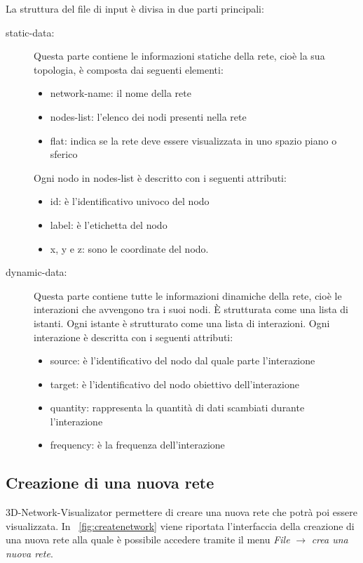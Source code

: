 \documentclass[a4paper,12pt]{article}
\begin{document}
La struttura del file di input \`e divisa in due parti principali:
\begin{description}
 \item[static-data:] Questa parte contiene le informazioni statiche della rete, cio\`e la sua topologia, \`e composta dai seguenti elementi:
 \begin{itemize}
  \item network-name: il nome della rete
  \item nodes-list: l'elenco dei nodi presenti nella rete
  \item flat: indica se la rete deve essere visualizzata in uno spazio piano o sferico
 \end{itemize}
Ogni nodo in nodes-list \`e descritto con i seguenti attributi:
 \begin{itemize}
  \item id: \`e l'identificativo univoco del nodo
  \item label: \`e l'etichetta del nodo
  \item x, y e z: sono le coordinate del nodo.
 \end{itemize}
 \item[dynamic-data:] Questa parte contiene tutte le informazioni dinamiche della rete, cio\`e le interazioni che avvengono tra i suoi nodi. \`E strutturata come una lista di istanti. Ogni istante \`e strutturato come una lista di interazioni. Ogni interazione \`e descritta con i seguenti attributi:
 \begin{itemize}
  \item source: \`e l'identificativo del nodo dal quale parte l'interazione
  \item target: \`e l'identificativo del nodo obiettivo dell'interazione
  \item quantity: rappresenta la quantità di dati scambiati durante l'interazione
  \item frequency: \`e la frequenza dell'interazione
 \end{itemize}
\end{description}
 
\subsection{Creazione di una nuova rete}
3D-Network-Visualizator permettere di creare una nuova rete che potr\`a poi essere visualizzata. In \figurename~\ref{fig:createnetwork} viene riportata l'interfaccia della creazione di una nuova rete alla quale \`e possibile accedere tramite il menu  \textit{File} $\rightarrow$ \textit{crea una nuova rete}.
\end{document}
